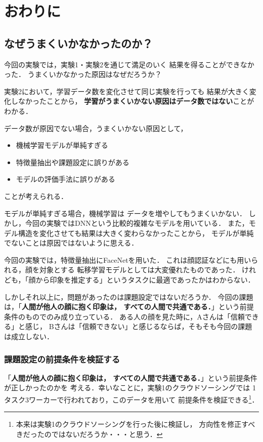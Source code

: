 \chapter{おわりに}
\section{なぜうまくいかなかったのか？}
今回の実験では，実験1・実験2を通じて満足のいく
結果を得ることができなかった．
うまくいかなかった原因はなぜだろうか？

実験2において，学習データ数を変化させて同じ実験を行っても
結果が大きく変化しなかったことから，
{\bf 学習がうまくいかない原因はデータ数ではない}ことがわかる．

データ数が原因でない場合，うまくいかない原因として，
\begin{itemize}
  \item 機械学習モデルが単純すぎる
  \item 特徴量抽出や課題設定に誤りがある
  \item モデルの評価手法に誤りがある
\end{itemize}
ことが考えられる．

モデルが単純すぎる場合，機械学習は
データを増やしてもうまくいかない．
しかし，今回の実験ではDNNという比較的複雑なモデルを用いている．
また，モデル構造を変化させても結果は大きく変わらなかったことから，
モデルが単純でないことは原因ではないように思える．

今回の実験では，特徴量抽出にFaceNetを用いた．
これは顔認証などにも用いられる，顔を対象とする
転移学習モデルとしては大変優れたものであった．
けれども，「顔から印象を推定する」というタスクに最適であったかはわからない．

しかしそれ以上に，問題があったのは課題設定ではないだろうか．
今回の課題は，「{\bf 人間が他人の顔に抱く印象は，
すべての人間で共通である．}」という前提条件のものでのみ成り立っている．
ある人の顔を見た時に，Aさんは「信頼できる」と感じ，
Bさんは「信頼できない」と感じるならば，そもそも今回の課題は成立しない．

\subsection{課題設定の前提条件を検証する}
「{\bf 人間が他人の顔に抱く印象は，
すべての人間で共通である．}」という前提条件が正しかったのかを
考える．幸いなことに，実験1のクラウドソーシングでは
1タスク3ワーカーで行われており，このデータを用いて
前提条件を検証できる\footnote{
  本来は実験1のクラウドソーシングを行った後に検証し，
  方向性を修正すべきだったのではないだろうか・・・と思う．
}．

